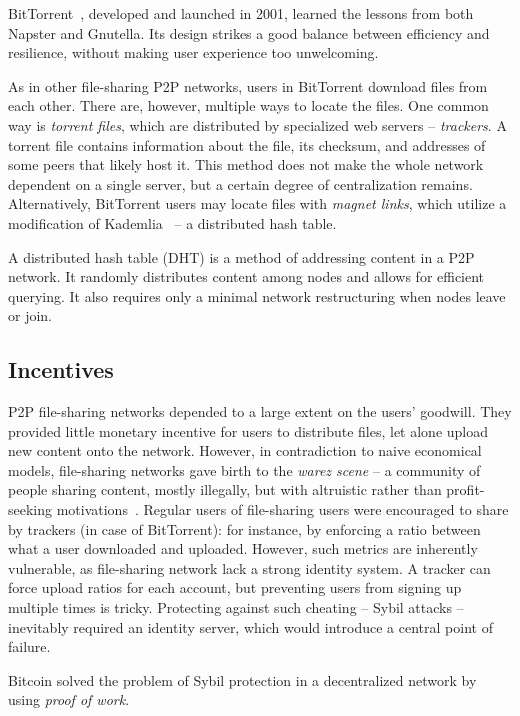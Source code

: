 BitTorrent~\cite{Pouwelse2005}, developed and launched in 2001, learned the lessons from both Napster and Gnutella.
Its design strikes a good balance between efficiency and resilience, without making user experience too unwelcoming.

As in other file-sharing P2P networks, users in BitTorrent download files from each other.
There are, however, multiple ways to locate the files.
One common way is \textit{torrent files}, which are distributed by specialized web servers -- \textit{trackers}.
A torrent file contains information about the file, its checksum, and addresses of some peers that likely host it.
This method does not make the whole network dependent on a single server, but a certain degree of centralization remains.
Alternatively, BitTorrent users may locate files with \textit{magnet links}, which utilize a modification of Kademlia~\cite{Maymounkov2002} -- a distributed hash table.

A distributed hash table (DHT) is a method of addressing content in a P2P network.
It randomly distributes content among nodes and allows for efficient querying.
It also requires only a minimal network restructuring when nodes leave or join.


\subsection{Incentives}

P2P file-sharing networks depended to a large extent on the users' goodwill.
They provided little monetary incentive for users to distribute files, let alone upload new content onto the network.
However, in contradiction to naive economical models, file-sharing networks gave birth to the \textit{warez scene} -- a community of people sharing content, mostly illegally, but with altruistic rather than profit-seeking motivations~\cite{Rehn2004}.
Regular users of file-sharing users were encouraged to share by trackers (in case of BitTorrent): for instance, by enforcing a ratio between what a user downloaded and uploaded.
However, such metrics are inherently vulnerable, as file-sharing network lack a strong identity system.
A tracker can force upload ratios for each account, but preventing users from signing up multiple times is tricky.
Protecting against such cheating -- Sybil attacks -- inevitably required an identity server, which would introduce a central point of failure.

Bitcoin solved the problem of Sybil protection in a decentralized network by using \textit{proof of work}.





